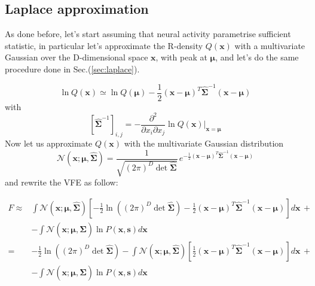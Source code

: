 \documentclass[a4paper, 10pt]{article}
\begin{document}
\subsection{Laplace approximation}
As done before, let's start assuming that neural activity parametrise sufficient statistic, in particular let's approximate the R-density $Q(\mathbf x)$ with a multivariate Gaussian over the D-dimensional space $\mathbf x$, with peak at $\boldsymbol \mu$, and let's do the same procedure done in Sec.(\ref{sec:laplace}).

\begin{equation}
\ln Q(\mathbf x) \simeq \ln Q(\boldsymbol{\mu}) - \frac{1}{2} (\mathbf x-\boldsymbol \mu)^T \boldsymbol{\hat{\Sigma}}^{-1} (\mathbf x-\boldsymbol \mu)
\end{equation}
with
\begin{equation}
\left[ \boldsymbol{\hat{\Sigma}}^{-1} \right]_{i,j} = - \frac{\partial^{2} }{\partial x_i \partial x_j} \ln Q(\mathbf x) \bigg\rvert_{\mathbf x=\boldsymbol \mu} 
\end{equation}
Now let us approximate $Q(\mathbf x)$ with the multivariate Gaussian distribution
\begin{equation}
\mathcal{N}(\mathbf x;\boldsymbol \mu, \boldsymbol{\hat{\Sigma}}) = \frac{1}{\sqrt{( 2 \pi)^{D} \det \boldsymbol{\hat{\Sigma}}}} \, e^{ - \frac{1}{2} (\mathbf x-\boldsymbol \mu)^T \boldsymbol{\hat{\Sigma}}^{-1} (\mathbf x-\boldsymbol \mu)}
\end{equation}
and rewrite the VFE as follow:

\begin{equation}
\label{eqn:f1}
\begin{split}
F \approx & \int \mathcal{N}(\mathbf x; \bm \mu, \bm{\hat{\Sigma}}) \left[ -\frac{1}{2} \ln \left( (2 \pi)^{D} \det \bm{\hat{\Sigma}} \right) - \frac{1}{2} (\mathbf x-\boldsymbol \mu)^T \boldsymbol{\hat{\Sigma}}^{-1} (\mathbf x-\boldsymbol \mu) \right] d \mathbf x \, + \\
	& - \int \mathcal{N}(\mathbf x;\bm \mu,\bm{\hat{\Sigma}}) \ln P(\mathbf x,\mathbf s) d \mathbf x \\
    = & -\frac{1}{2} \ln \left( (2 \pi)^{D} \det \bm{\hat{\Sigma}} \right) - \int \mathcal{N}(\mathbf x; \bm \mu, \bm{\hat{\Sigma}}) \left[ \frac{1}{2} (\mathbf x-\boldsymbol \mu)^T \boldsymbol{\hat{\Sigma}}^{-1} (\mathbf x-\boldsymbol \mu) \right] d \mathbf x \, + \\
    & - \int \mathcal{N}(\mathbf x;\bm \mu,\bm{\hat{\Sigma}}) \ln P(\mathbf x,\mathbf s) d \mathbf x 
\end{split}
\end{equation}
\end{document}
